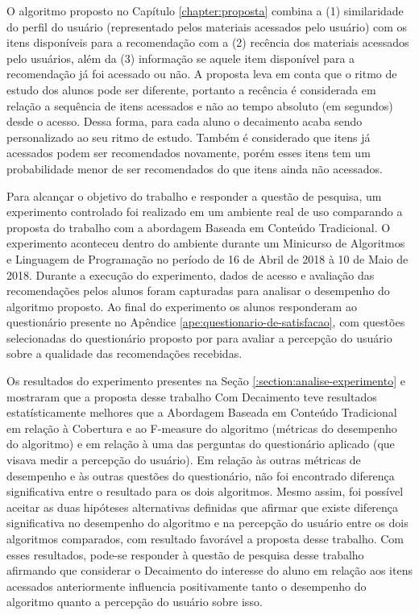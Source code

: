 O algoritmo proposto no Capítulo \ref{chapter:proposta} combina a (1) similaridade do perfil do usuário (representado
pelos materiais acessados pelo usuário) com os itens disponíveis para a recomendação com a (2) recência dos materiais
acessados pelo usuários, além da (3) informação se aquele item disponível para a recomendação já foi acessado ou não. A
proposta leva em conta que o ritmo de estudo dos alunos pode ser diferente, portanto a recência é considerada em relação
a sequência de itens acessados e não ao tempo absoluto (em segundos) desde o acesso. Dessa forma, para cada aluno o
decaimento acaba sendo personalizado ao seu ritmo de estudo. Também é considerado que itens já acessados podem ser
recomendados novamente, porém esses itens tem um probabilidade menor de ser recomendados do que itens ainda não acessados.

Para alcançar o objetivo do trabalho e responder a questão de pesquisa, um experimento controlado foi realizado em um ambiente
real de uso comparando a proposta do trabalho com a abordagem Baseada em Conteúdo Tradicional. O experimento aconteceu
dentro do ambiente \adaptwebspace durante um Minicurso de Algoritmos e Linguagem de Programação no período de 16 de Abril de
2018 à 10 de Maio de 2018. Durante a execução do experimento, dados de acesso e avaliação das recomendações pelos alunos
foram capturadas para analisar o desempenho do algoritmo proposto. Ao final do experimento os alunos responderam ao questionário presente no Apêndice
\ref{ape:questionario-de-satisfacao}, com questões selecionadas do questionário proposto por  para
avaliar a percepção do usuário sobre a qualidade das recomendações recebidas.

Os resultados do experimento presentes na Seção \ref{:section:analise-experimento} e mostraram que a proposta desse
trabalho Com Decaimento teve resultados estatísticamente melhores que a Abordagem Baseada em Conteúdo Tradicional em
relação à Cobertura e ao F-measure do algoritmo (métricas do desempenho do algoritmo) e em relação à uma das perguntas
do questionário aplicado (que visava medir a percepção do usuário). Em relação às outras métricas de desempenho e às
outras questões do questionário, não foi encontrado diferença significativa entre o resultado para os dois algoritmos.
Mesmo assim, foi possível aceitar as duas hipóteses alternativas definidas que afirmar que existe diferença significativa
no desempenho do algoritmo e na percepção do usuário entre os dois algoritmos comparados, com resultado favorável
a proposta desse trabalho. Com esses resultados, pode-se responder à questão de pesquisa desse trabalho afirmando que considerar o Decaimento do
interesse do aluno em relação aos itens acessados anteriormente influencia positivamente tanto o desempenho do algoritmo
quanto a percepção do usuário sobre isso.

